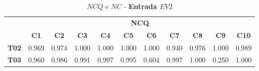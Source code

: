\begin{table}[htbp]
	\centering
	\caption{$NCQ$ e $NC$ - \textbf{Entrada $EV2$}}
	\begin{tabular}{|c|cccccccccc|}
		\hline
		\rowcolor[HTML]{D0CECE} 
		\cellcolor[HTML]{D0CECE}                                 & \multicolumn{10}{c|}{\cellcolor[HTML]{D0CECE}\textbf{NCQ}}                                                                                                                                                                                                                                                                                                                                                                                                                                                                                                      \\ \cline{2-11} 
		\rowcolor[HTML]{D0CECE} 
		\multirow{-2}{*}{\cellcolor[HTML]{D0CECE}\textbf{Part.}} & \multicolumn{1}{c|}{\cellcolor[HTML]{D0CECE}\textbf{C1}} & \multicolumn{1}{c|}{\cellcolor[HTML]{D0CECE}\textbf{C2}} & \multicolumn{1}{c|}{\cellcolor[HTML]{D0CECE}\textbf{C3}} & \multicolumn{1}{c|}{\cellcolor[HTML]{D0CECE}\textbf{C4}} & \multicolumn{1}{c|}{\cellcolor[HTML]{D0CECE}\textbf{C5}} & \multicolumn{1}{c|}{\cellcolor[HTML]{D0CECE}\textbf{C6}} & \multicolumn{1}{c|}{\cellcolor[HTML]{D0CECE}\textbf{C7}} & \multicolumn{1}{c|}{\cellcolor[HTML]{D0CECE}\textbf{C8}} & \multicolumn{1}{c|}{\cellcolor[HTML]{D0CECE}\textbf{C9}} & \textbf{C10} \\ \hline
		\textbf{T02}                                             & \multicolumn{1}{c|}{0.969}                               & \multicolumn{1}{c|}{0.974}                               & \multicolumn{1}{c|}{1.000}                               & \multicolumn{1}{c|}{1.000}                               & \multicolumn{1}{c|}{1.000}                               & \multicolumn{1}{c|}{1.000}                               & \multicolumn{1}{c|}{0.940}                               & \multicolumn{1}{c|}{0.976}                               & \multicolumn{1}{c|}{1.000}                               & 0.989        \\ \hline
		\rowcolor[HTML]{F2F2F2} 
		\textbf{T03}                                             & \multicolumn{1}{c|}{\cellcolor[HTML]{F2F2F2}0.960}       & \multicolumn{1}{c|}{\cellcolor[HTML]{F2F2F2}0.986}       & \multicolumn{1}{c|}{\cellcolor[HTML]{F2F2F2}0.991}       & \multicolumn{1}{c|}{\cellcolor[HTML]{F2F2F2}0.997}       & \multicolumn{1}{c|}{\cellcolor[HTML]{F2F2F2}0.995}       & \multicolumn{1}{c|}{\cellcolor[HTML]{F2F2F2}0.604}       & \multicolumn{1}{c|}{\cellcolor[HTML]{F2F2F2}0.997}       & \multicolumn{1}{c|}{\cellcolor[HTML]{F2F2F2}1.000}       & \multicolumn{1}{c|}{\cellcolor[HTML]{F2F2F2}0.250}       & 1.000        \\ \hline

\end{tabular}
\end{table}

